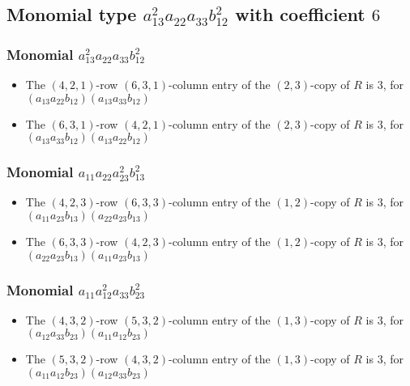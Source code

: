 \documentclass{article}
\begin{document}
\subsection{Monomial type $ a_{13}^{2} a_{22} a_{33} b_{12}^{2} $ with coefficient $ 6 $}

\subsubsection{Monomial $ a_{13}^{2} a_{22} a_{33} b_{12}^{2} $}

\begin{itemize}
\item The $(4, 2, 1)$-row $(6, 3, 1)$-column entry of the $ \left(2, 3\right) $-copy of $R$ is $ 3 $, for $( a_{13} a_{22} b_{12} )( a_{13} a_{33} b_{12} )$ 
\item The $(6, 3, 1)$-row $(4, 2, 1)$-column entry of the $ \left(2, 3\right) $-copy of $R$ is $ 3 $, for $( a_{13} a_{33} b_{12} )( a_{13} a_{22} b_{12} )$ 
\end{itemize}
\subsubsection{Monomial $ a_{11} a_{22} a_{23}^{2} b_{13}^{2} $}

\begin{itemize}
\item The $(4, 2, 3)$-row $(6, 3, 3)$-column entry of the $ \left(1, 2\right) $-copy of $R$ is $ 3 $, for $( a_{11} a_{23} b_{13} )( a_{22} a_{23} b_{13} )$ 
\item The $(6, 3, 3)$-row $(4, 2, 3)$-column entry of the $ \left(1, 2\right) $-copy of $R$ is $ 3 $, for $( a_{22} a_{23} b_{13} )( a_{11} a_{23} b_{13} )$ 
\end{itemize}
\subsubsection{Monomial $ a_{11} a_{12}^{2} a_{33} b_{23}^{2} $}

\begin{itemize}
\item The $(4, 3, 2)$-row $(5, 3, 2)$-column entry of the $ \left(1, 3\right) $-copy of $R$ is $ 3 $, for $( a_{12} a_{33} b_{23} )( a_{11} a_{12} b_{23} )$ 
\item The $(5, 3, 2)$-row $(4, 3, 2)$-column entry of the $ \left(1, 3\right) $-copy of $R$ is $ 3 $, for $( a_{11} a_{12} b_{23} )( a_{12} a_{33} b_{23} )$ 
\end{itemize}
\end{document}
